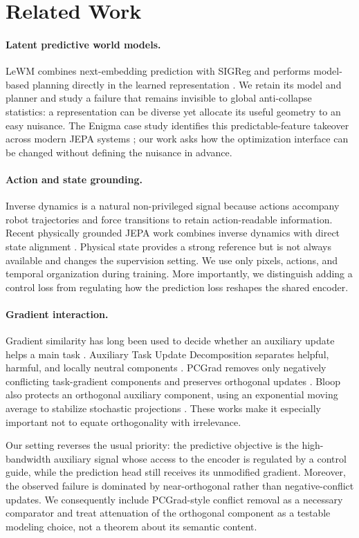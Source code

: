 \section{Related Work}

\paragraph{Latent predictive world models.}
LeWM combines next-embedding prediction with SIGReg and performs model-based
planning directly in the learned representation \citep{maes2026leworldmodel}.
We retain its model and planner and study a failure that remains invisible to
global anti-collapse statistics: a representation can be diverse yet allocate
its useful geometry to an easy nuisance.  The Enigma case study identifies
this predictable-feature takeover across modern JEPA systems
\citep{enigma2026obsessed}; our work asks how the optimization interface can be
changed without defining the nuisance in advance.

\paragraph{Action and state grounding.}
Inverse dynamics is a natural non-privileged signal because actions accompany
robot trajectories and force transitions to retain action-readable
information.  Recent physically grounded JEPA work combines inverse dynamics
with direct state alignment \citep{liu2026physicallygrounded}.  Physical state
provides a strong reference but is not always available and changes the
supervision setting.  We use only pixels, actions, and temporal organization
during training.  More importantly, we distinguish adding a control loss from
regulating how the prediction loss reshapes the shared encoder.

\paragraph{Gradient interaction.}
Gradient similarity has long been used to decide whether an auxiliary update
helps a main task \citep{du2018auxiliary}.  Auxiliary Task Update Decomposition
separates helpful, harmful, and locally neutral components
\citep{dery2021atud}.  PCGrad removes only negatively conflicting task-gradient
components and preserves orthogonal updates \citep{yu2020pcgrad}.  Bloop also
protects an orthogonal auxiliary component, using an exponential moving average
to stabilize stochastic projections \citep{hsieh2024bloop}.  These works make
it especially important not to equate orthogonality with irrelevance.

Our setting reverses the usual priority: the predictive objective is the
high-bandwidth auxiliary signal whose access to the encoder is regulated by a
control guide, while the prediction head still receives its unmodified
gradient.  Moreover, the observed failure is dominated by near-orthogonal
rather than negative-conflict updates.  We consequently include PCGrad-style
conflict removal as a necessary comparator and treat attenuation of the
orthogonal component as a testable modeling choice, not a theorem about its
semantic content.
